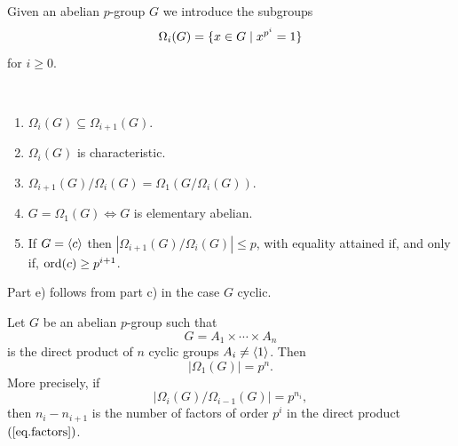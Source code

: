 \begin{ntn}
    Given an abelian\/ $p$-group\/ $G$ we introduce the subgroups
    $$
        \Omega_i(G) = \{x\in G\mid x^{p^i}=1\}
    $$
    for\/ $i\ge0$.
\end{ntn}

\begin{rem}\label{omega-props}${}$
    \begin{enumerate}[\upshape a)]
        \item $\Omega_i(G)\subseteq\Omega_{i+1}(G)$. 
        \item $\Omega_i(G)$ is characteristic.
        \item $\Omega_{i+1}(G)/\Omega_i(G) = \Omega_1(G/\Omega_i(G))$.
        \item $G=\Omega_1(G)\iff G$ is elementary abelian.
        \item If\/ $G=\langle c\rangle$ then\/ $|\Omega_{i+1}(G)/\Omega_i(G)|\le p$, with equality attained if, and only if, ${\rm ord}(c)\ge p^{i+1}$.
    \end{enumerate}
    \textrm{\upshape Part e) follows from part c) in the case $G$ cyclic.}
\end{rem}

\begin{thm}\label{cyclic-factors-of-order-p^i}
    Let\/ $G$ be an abelian\/ $p$-group such that
    \begin{equation}\label{eq.factors}\tag{*}
        G = A_1 \times \cdots \times A_n
    \end{equation}
    is the direct product of\/ $n$ cyclic groups\/ $A_i \ne\langle1\rangle$. Then
    $$
        |\Omega_1(G)| = p^n.
    $$
    More precisely, if
    $$
        |\Omega_i(G)/\Omega_{i-1}(G)| = p^{n_i},
    $$
    then\/ $n_i - n_{i+1}$ is the number of factors of order\/ $p^i$ in the direct product~$(\ref{eq.factors})$.
\end{thm}


